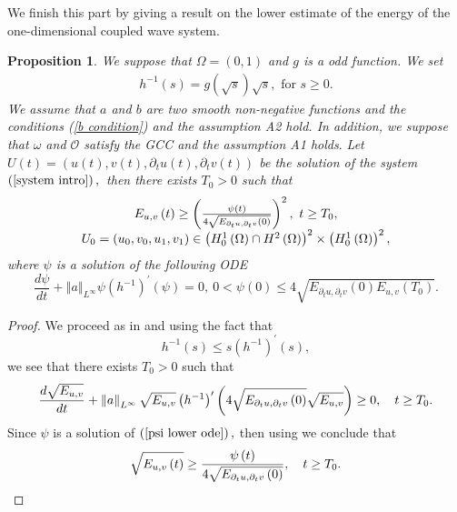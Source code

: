 \documentclass[11pt,reqno]{amsart}
\theoremstyle{plain}
\newtheorem{proposition}{Proposition}
\numberwithin{equation}{section}
\numberwithin{equation}{section}
\begin{document}
We finish this part by giving a result on the lower estimate of the energy
of the one-dimensional coupled wave system.

\begin{proposition}
We suppose that $\Omega =(0,1)$ and $g$ is a odd function. We set 
\begin{equation*}
\begin{array}{c}
h^{-1}\left( s\right) =g\left( \sqrt{s}\right) \sqrt{s},\text{ for }s\geq 0.%
\end{array}%
\end{equation*}%
We assume that $a$ and $b$ are two smooth non-negative functions and the
conditions (\ref{b condition}) and the assumption A2 hold. In addition, we
suppose that $\omega $ and $\mathcal{O}$ satisfy the GCC and the assumption
A1 holds$.$ Let $U\left( t\right) =\left( u\left( t\right) ,v\left( t\right)
,\partial _{t}u\left( t\right) ,\partial _{t}v\left( t\right) \right) $ be
the solution of the system $\left( \ref{system intro}\right) ,$\ then there
exists $T_{0}>0$ such that%
\begin{equation*}
\begin{array}{c}
E_{u,v}\left( t\right) \geq \left( \frac{\psi \left( t\right) }{4\sqrt{%
E_{\partial _{t}u,\partial _{t}v}\left( 0\right) }}\right) ^{2},~t\geq T_{0},
\\ 
U_{0}=\left( u_{0},v_{0},u_{1},v_{1}\right) \in \left( H_{0}^{1}\left(
\Omega \right) \cap H^{2}\left( \Omega \right) \right) ^{2}\times \left(
H_{0}^{1}\left( \Omega \right) \right) ^{2},%
\end{array}%
\end{equation*}%
where $\psi $ is a solution of the following ODE%
\begin{equation}
\dfrac{d\psi }{dt}+\left\Vert a\right\Vert _{L^{\infty }}\psi \left(
h^{-1}\right) ^{\prime }\left( \psi \right) =0,~0<\psi \left( 0\right) \leq 4%
\sqrt{E_{\partial _{t}u,\partial _{t}v}\left( 0\right) E_{u,v}\left(
T_{0}\right) }.  \label{psi lower ode}
\end{equation}
\end{proposition}

\begin{proof}
We proceed as in \cite{Ala nonl} and using the fact that%
\begin{equation*}
h^{-1}\left( s\right) \leq s\left( h^{-1}\right) ^{\prime }\left( s\right) ,
\end{equation*}%
we see that there exists $T_{0}>0$ such that%
\begin{equation*}
\dfrac{d\sqrt{E_{u,v}}}{dt}+\left\Vert a\right\Vert _{L^{\infty }}\sqrt{%
E_{u,v}}\left( h^{-1}\right) ^{\prime }\left( 4\sqrt{E_{\partial
_{t}u,\partial _{t}v}\left( 0\right) }\sqrt{E_{u,v}}\right) \geq 0,\text{ }%
t\geq T_{0}.
\end{equation*}%
Since $\psi $ is a solution of $\left( \ref{psi lower ode}\right) ,$ then
using \cite[Lemma 1]{daou jmaa} we conclude that 
\begin{equation*}
\sqrt{E_{u,v}\left( t\right) }\geq \frac{\psi \left( t\right) }{4\sqrt{%
E_{\partial _{t}u,\partial _{t}v}\left( 0\right) }},\text{ }t\geq T_{0}.
\end{equation*}
\end{proof}
\end{document}
